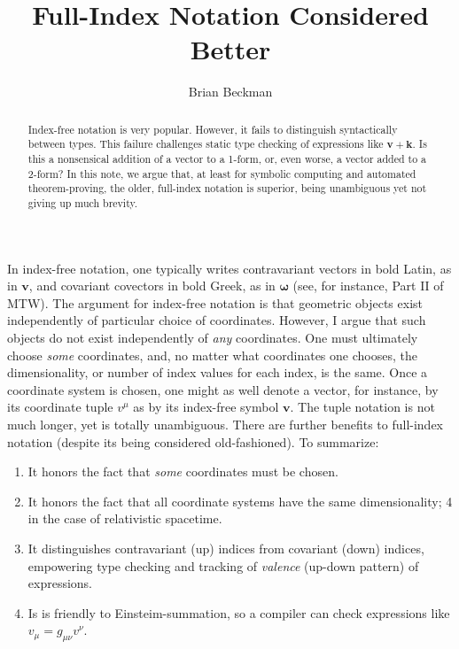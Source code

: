 \documentclass[no-fonts,nols]{tufte-handout}
\title{Full-Index Notation Considered Better}
\author{Brian Beckman}
\begin{document}
\maketitle

\begin{abstract} \noindent Index-free notation is very popular.
	However, it fails to distinguish syntactically between types.
	This failure challenges static type checking of expressions
	like $\symbf{v}+\symbf{k}$. Is this a nonsensical addition of
	a vector to a 1\nobreakdash-form, or, even worse, a vector
	added to a 2\nobreakdash-form? In this note, we argue that,
	at least for symbolic computing and automated
	theorem-proving, the older, full-index notation is superior,
	being unambiguous yet not giving up much brevity. 
\end{abstract}

\noindent In index-free notation, one typically writes contravariant
vectors in bold Latin, as in $\symbf{v}$, and covariant covectors in
bold Greek, as in $\symbf{\omega}$ (see, for instance, Part II of
MTW\cite{MTW2017}). The argument for index-free notation is that
geometric objects exist independently of particular choice of
coordinates. However, I argue that such objects do not exist
independently of \textit{any} coordinates. One must ultimately choose
\textit{some} coordinates, and, no matter what coordinates one
chooses, the dimensionality, or number of index values for each
index, is the same. Once a coordinate system is chosen, one might as
well denote a vector, for instance, by its coordinate tuple $v^\mu$
as by its index-free symbol $\symbf{v}$. The tuple notation is not
much longer, yet is totally unambiguous. There are further benefits
to full-index notation (despite its being considered
old-fashioned).\cite{lovelock1989tensors} To summarize:

\begin{enumerate} 

	\item It honors the fact that \textit{some} coordinates must
		be chosen.

	\item It honors the fact that all coordinate systems have the
		same dimensionality; 4 in the case of relativistic
		spacetime.

	\item It distinguishes contravariant (up) indices from
		covariant (down) indices, empowering type checking
		and tracking of \textit{valence} (up-down pattern) of
		expressions.

	\item Is is friendly to Einsteim-summation, so a
		compiler\cite{RelativityToolkit} can check
		expressions like $v_{\mu}=g_{\mu\nu}v^{\nu}$.

\end{enumerate}
\end{document}
